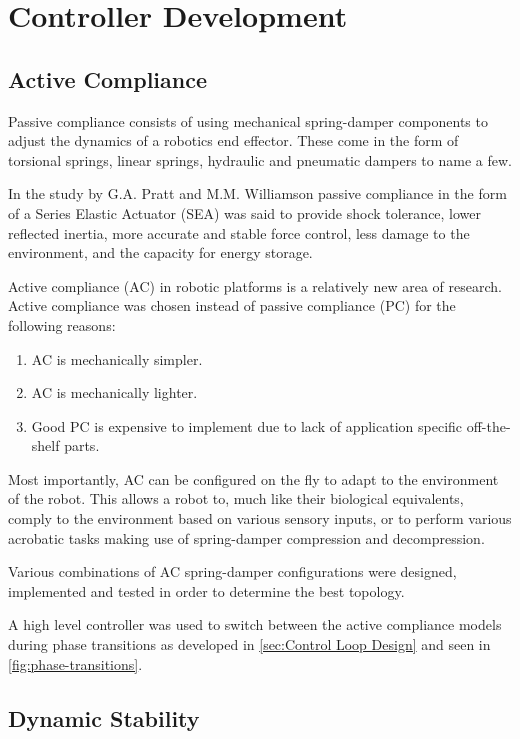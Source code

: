 \chapter{Controller Development}
\label{chap:Controller Development}

\section{Active Compliance}

Passive compliance consists of using mechanical spring-damper components to adjust the dynamics of a robotics end effector. These come in the form of torsional springs, linear springs, hydraulic and pneumatic dampers to name a few. 

In the study by G.A. Pratt and M.M. Williamson  passive compliance in the form of a Series Elastic Actuator (SEA) was said to provide shock tolerance, lower reflected 
inertia, more accurate and stable force control, less damage to the environment, and the capacity for energy storage.\cite{Pratt1995}

Active compliance (AC) in robotic platforms is a relatively new area of research. Active compliance was chosen instead of passive compliance (PC) for the following reasons:

\begin{enumerate}
\item AC is mechanically simpler.
\item AC is mechanically lighter.
\item Good PC is expensive to implement due to lack of application specific off-the-shelf parts.
\end{enumerate}

Most importantly, AC can be configured on the fly to adapt to the environment of the robot. This allows a robot to, much like their biological equivalents, comply to the environment based on various sensory inputs, or to perform various acrobatic tasks making use of spring-damper compression and decompression.

Various combinations of AC spring-damper configurations were designed, implemented and tested in order to determine the best topology.

A high level controller was used to switch between the active compliance models during phase transitions as developed in \cref{sec:Control Loop Design} and seen in \cref{fig:phase-transitions}.

\section{Dynamic Stability}

